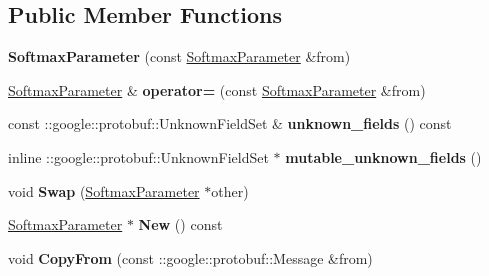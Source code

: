 \subsection*{Public Member Functions}
\begin{DoxyCompactItemize}
\item 
\mbox{\label{classcaffe_1_1_softmax_parameter_ae73bd08a4ce30b542d1fae233c06bf23}} 
{\bfseries Softmax\+Parameter} (const \mbox{\hyperlink{classcaffe_1_1_softmax_parameter}{Softmax\+Parameter}} \&from)
\item 
\mbox{\label{classcaffe_1_1_softmax_parameter_a53e5b0f0b40b9e28eddc1ac8f6b596c3}} 
\mbox{\hyperlink{classcaffe_1_1_softmax_parameter}{Softmax\+Parameter}} \& {\bfseries operator=} (const \mbox{\hyperlink{classcaffe_1_1_softmax_parameter}{Softmax\+Parameter}} \&from)
\item 
\mbox{\label{classcaffe_1_1_softmax_parameter_acc4675acf274eba1343472e4b9523e65}} 
const \+::google\+::protobuf\+::\+Unknown\+Field\+Set \& {\bfseries unknown\+\_\+fields} () const
\item 
\mbox{\label{classcaffe_1_1_softmax_parameter_a5112e506c6d1a70973c9f93ff6b78d3d}} 
inline \+::google\+::protobuf\+::\+Unknown\+Field\+Set $\ast$ {\bfseries mutable\+\_\+unknown\+\_\+fields} ()
\item 
\mbox{\label{classcaffe_1_1_softmax_parameter_a261ca2d11c9e1c6a068d983109cd7000}} 
void {\bfseries Swap} (\mbox{\hyperlink{classcaffe_1_1_softmax_parameter}{Softmax\+Parameter}} $\ast$other)
\item 
\mbox{\label{classcaffe_1_1_softmax_parameter_a45b3de61ddf0bde76e7d83b2b2227fd1}} 
\mbox{\hyperlink{classcaffe_1_1_softmax_parameter}{Softmax\+Parameter}} $\ast$ {\bfseries New} () const
\item 
\mbox{\label{classcaffe_1_1_softmax_parameter_a47c2fc9c41c3cad954980f61cc42e2a1}} 
void {\bfseries Copy\+From} (const \+::google\+::protobuf\+::\+Message \&from)
\item 
\mbox{\label{classcaffe_1_1_softmax_parameter_a545a48644e6bd2dfef7d6bc125f90a08}} 

\end{DoxyCompactItemize}
